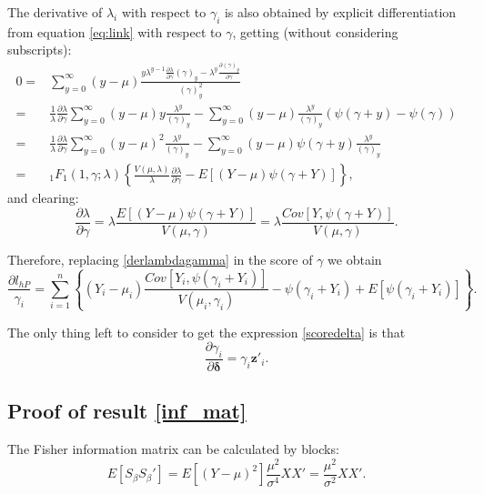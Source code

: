 The derivative of $ \lambda_i $ with respect to $ \gamma_i $ is also obtained by explicit differentiation from equation \eqref{eq:link} with respect to $ \gamma $, getting (without considering subscripts):
\begin{align*}
    0 = & \sum_{y=0}^{\infty} (y-\mu) \frac{y \lambda^{y-1} \frac{\partial \lambda}{\partial \gamma} \left(\gamma\right)_{y} - \lambda^y \frac{\partial \left(\gamma\right)_{y}}{\partial \gamma}}{\left(\gamma\right)_{y}^2} \\
    = & \frac{1}{\lambda} \frac{\partial \lambda}{\partial \gamma} \sum_{y=0}^{\infty} \left(y-\mu\right) y \frac{\lambda^{y}}{\left(\gamma\right)_{y}} - \sum_{y=0}^{\infty} \left(y-\mu\right) \frac{\lambda^y}{\left(\gamma\right)_{y}} \left(\psi\left(\gamma+y\right)- \psi\left(\gamma\right) \right) \\
    = & \frac{1}{\lambda} \frac{\partial \lambda}{\partial \gamma} \sum_{y=0}^{\infty} \left(y-\mu\right)^2 \frac{\lambda^{y}}{\left(\gamma\right)_{y}} - \sum_{y=0}^{\infty} \left(y-\mu\right) \psi\left(\gamma+y\right) \frac{\lambda^y}{\left(\gamma\right)_{y}} \\
    = & _{1}F_{1}\left(1, \gamma; \lambda \right) \left\{ \frac{V\left(\mu,\lambda\right)}{\lambda} \frac{\partial \lambda}{\partial \gamma} - E \left[\left(Y-\mu\right) \psi\left(\gamma+Y\right) \right] \right\},
\end{align*}
and clearing:
\begin{equation}\label{derlambdagamma}
    \frac{\partial \lambda}{\partial \gamma} = \lambda \frac{E \left[\left(Y-\mu\right) \psi\left(\gamma+Y\right) \right]}{V\left(\mu,\gamma\right)} = \lambda \frac{Cov \left[Y, \psi\left(\gamma+Y\right) \right]}{V\left(\mu,\gamma\right)}.
\end{equation}

Therefore, replacing \eqref{derlambdagamma} in the score of $ \gamma $ we obtain
\begin{equation}\label{scoregamma}
    \frac{\partial l_{hP}}{\gamma_i} = \sum_{i=1}^n \left\{\left(Y_i - \mu_i\right)\frac{Cov \left[Y_i, \psi\left(\gamma_i+Y_i\right) \right]}{V\left(\mu_i,\gamma_i\right)} - \psi\left(\gamma_i+Y_i\right) + E \left[ \psi\left(\gamma_i+Y_i\right) \right]  \right\}.
\end{equation}

The only thing left to consider to get the expression \eqref{scoredelta} is that
$$ \frac{\partial \gamma_i}{\partial \boldsymbol{\delta}} = \gamma_i \mathbf{z}'_i.$$


\subsection*{Proof of result \ref{inf_mat}}
The Fisher information matrix can be calculated by blocks:
\[
E\left[S_{\beta}S_{\beta}'\right] = E\left[\left(Y - \mu\right)^2\right]\frac{\mu^2}{\sigma^4}XX' = \frac{\mu^2}{\sigma^2}XX'.
\]

